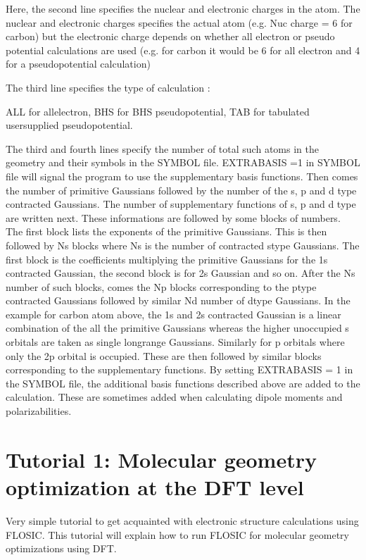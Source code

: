 \documentclass[letterpaper,10pt,english,openany,oneside]{sphinxmanual}
\begin{document}
\sphinxAtStartPar
Here, the second line specifies the nuclear and electronic charges in the atom. The nuclear and electronic charges specifies the actual atom (e.g. Nuc charge = 6 for carbon) but the electronic charge depends on whether all electron or pseudo potential calculations are used (e.g. for carbon it would be 6 for all electron and 4 for a pseudopotential calculation)

\sphinxAtStartPar
The third line specifies the type of calculation :

\sphinxAtStartPar
ALL for all\sphinxhyphen{}electron, BHS for BHS pseudopotential, TAB for tabulated user\sphinxhyphen{}supplied pseudopotential.

\sphinxAtStartPar
The third and fourth lines specify the number of total such atoms in the geometry
and their symbols in the SYMBOL file. EXTRABASIS =1 in SYMBOL file will signal
the program to use the supplementary basis functions. Then comes the number of
primitive Gaussians followed by the number of the s, p and d \sphinxhyphen{}type contracted
Gaussians. The number of supplementary functions of s, p and d type are written next.
These informations are followed by some blocks of numbers. The first block lists the
exponents of the primitive Gaussians. This is then followed by Ns blocks where Ns
is the number of contracted s\sphinxhyphen{}type Gaussians. The first block is the coefficients
multiplying the primitive Gaussians for the 1s contracted Gaussian, the second block
is for 2s Gaussian and so on. After the Ns number of such blocks, comes the Np blocks
corresponding to the p\sphinxhyphen{}type contracted Gaussians followed by similar Nd number of d\sphinxhyphen{}type Gaussians. In the example for carbon atom above, the 1s and 2s contracted Gaussian is a linear combination of the all the primitive Gaussians whereas the higher unoccupied s orbitals are taken as single long\sphinxhyphen{}range Gaussians. Similarly for p orbitals where only the 2p orbital is occupied. These are then followed by similar blocks corresponding to the supplementary functions.
By setting EXTRABASIS = 1 in the SYMBOL file, the additional basis functions described above are added to the calculation.  These are sometimes added when calculating dipole moments and polarizabilities.


\chapter{Tutorial 1: Molecular geometry optimization at the DFT level}
\label{\detokenize{tutorials/dtutorials/tutorial1:tutorial-1-molecular-geometry-optimization-at-the-dft-level}}\label{\detokenize{tutorials/dtutorials/tutorial1::doc}}
\sphinxAtStartPar
Very simple  tutorial  to get acquainted with electronic structure calculations using FLOSIC. This tutorial will explain how to run FLOSIC for molecular
geometry optimizations using DFT.
\end{document}
